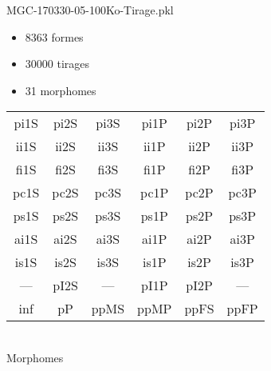 MGC-170330-05-100Ko-Tirage.pkl
\begin{itemize}
\item 8363 formes
\item 30000 tirages
\item 31 morphomes
\end{itemize}
\begin{center}
\begin{tabular}{cccccc}
\hline
\cellcolor{white}pi1S & \cellcolor{orange}pi2S & \cellcolor{orange}pi3S & \cellcolor{white}pi1P & \cellcolor{white}pi2P & \cellcolor{white}pi3P\\
\cellcolor{brown}ii1S & \cellcolor{brown}ii2S & \cellcolor{brown}ii3S & \cellcolor{white}ii1P & \cellcolor{white}ii2P & \cellcolor{brown}ii3P\\
\cellcolor{yellow}fi1S & \cellcolor{lime}fi2S & \cellcolor{lime}fi3S & \cellcolor{green}fi1P & \cellcolor{white}fi2P & \cellcolor{green}fi3P\\
\cellcolor{yellow}pc1S & \cellcolor{yellow}pc2S & \cellcolor{yellow}pc3S & \cellcolor{white}pc1P & \cellcolor{white}pc2P & \cellcolor{yellow}pc3P\\
\cellcolor{teal}ps1S & \cellcolor{white}ps2S & \cellcolor{teal}ps3S & \cellcolor{white}ps1P & \cellcolor{white}ps2P & \cellcolor{teal}ps3P\\
\cellcolor{white}ai1S & \cellcolor{lightgray}ai2S & \cellcolor{lightgray}ai3S & \cellcolor{white}ai1P & \cellcolor{magenta}ai2P & \cellcolor{white}ai3P\\
\cellcolor{black}is1S & \cellcolor{black}is2S & \cellcolor{lightgray}is3S & \cellcolor{black}is1P & \cellcolor{black}is2P & \cellcolor{white}is3P\\
--- & \cellcolor{white}pI2S & --- & \cellcolor{white}pI1P & \cellcolor{white}pI2P & ---\\
\cellcolor{white}inf & \cellcolor{white}pP & \cellcolor{white}ppMS & \cellcolor{white}ppMP & \cellcolor{magenta}ppFS & \cellcolor{magenta}ppFP\\
\hline
\end{tabular}\\
Morphomes
\end{center}
\bigskip

